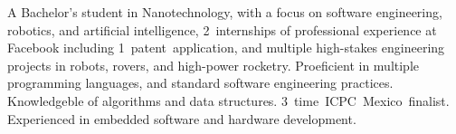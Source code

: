 

\begin{cvparagraph}

A Bachelor's student in Nanotechnology, with a focus on software engineering, robotics, and artificial intelligence, 2~internships of professional experience at Facebook including 1~patent~application, and multiple high-stakes engineering projects in robots, rovers, and high-power rocketry. Proeficient in multiple programming languages, and standard software engineering practices. Knowledgeble of algorithms and data structures. 3~time~ICPC~Mexico~finalist. Experienced in embedded software and hardware development.
\end{cvparagraph}